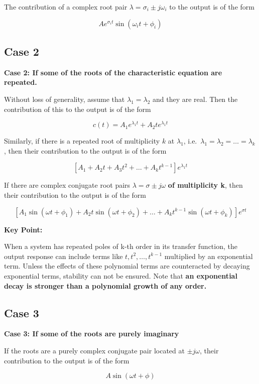 \documentclass[
  14pt,
  a4paper,
  oneside,
  open=any,
  a4paper,
  14pt]{report}
\begin{document}
The contribution of a complex root pair
\(\lambda = \sigma_i \pm j\omega_i\) to the output is of the form

\[
    Ae^{\sigma_i t} \sin(\omega_i t + \phi_i)
\]

\subsection{Case 2}\label{case-2}

\textbf{Case 2: If some of the roots of the characteristic equation are
repeated.}

Without loss of generality, assume that \(\lambda_1 = \lambda_2\) and
they are real. Then the contribution of this to the output is of the
form

\[
    c(t) = A_1 e^{\lambda_1 t} + A_2 t e^{\lambda_1 t}
\]

Similarly, if there is a repeated root of multiplicity \(k\) at
\(\lambda_1\), i.e.~\(\lambda_1 = \lambda_2 = \ldots = \lambda_k\), then
their contribution to the output is of the form

\[
    [A_1 + A_2 t + A_3 t^2 + \ldots + A_k t^{k-1}]e^{\lambda_1 t}
\]

If there are complex conjugate root pairs
\(\lambda = \sigma \pm j\omega\) \textbf{of multiplicity k}, then their
contribution to the output is of the form

\[
    [A_1 \sin(\omega t + \phi_1) + A_2 t \sin(\omega t + \phi_2) + \ldots + A_k t^{k-1} \sin(\omega t + \phi_k)]e^{\sigma t}
\]

\textbf{Key Point:}

When a system has repeated poles of k-th order in its transfer function,
the output response can include terms like \(t, t^2, \ldots, t^{k-1}\)
multiplied by an exponential term. Unless the effects of these
polynomial terms are counteracted by decaying exponential terms,
stability can not be ensured. Note that \textbf{an exponential decay is
stronger than a polynomial growth of any order.}

\subsection{Case 3}\label{case-3}

\textbf{Case 3: If some of the roots are purely imaginary}

If the roots are a purely complex conjugate pair located at
\(\pm j\omega\), their contribution to the output is of the form

\[
    A \sin (\omega t + \phi)
\]
\end{document}
